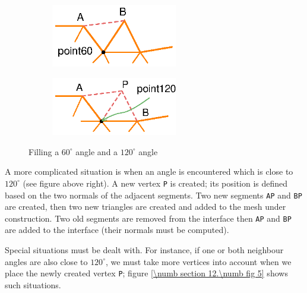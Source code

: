 \begin{figure}[ht] \centering
\begin{subfigure}{71mm}\centering
  \includegraphics[width=55mm]{fill-angle-60}
\end{subfigure}  
\begin{subfigure}{71mm}\centering
  \includegraphics[width=55mm]{fill-angle-120}
\end{subfigure}  
  \caption{Filling a $ 60^\circ $ angle and a $ 120^\circ $ angle}
  \label{\numb section 12.\numb fig 4}
\end{figure}

A more complicated situation is when an angle is encountered which is close to $ 120^\circ $
(see figure above right).
A new vertex {\small\tt P} is created; its position is defined based on the two normals
of the adjacent segments.
Two new segments {\small\tt AP} and {\small\tt BP} are created,
then two new triangles are created and added to the mesh under construction.
Two old segments are removed from the interface then {\small\tt AP} and {\small\tt BP} are added
to the interface (their normals must be computed).

Special situations must be dealt with.
For instance, if one or both neighbour angles are also close to $ 120^\circ $,
we must take more vertices into account when we place the newly created vertex {\small\tt P};
figure \ref{\numb section 12.\numb fig 5} shows such situations.


